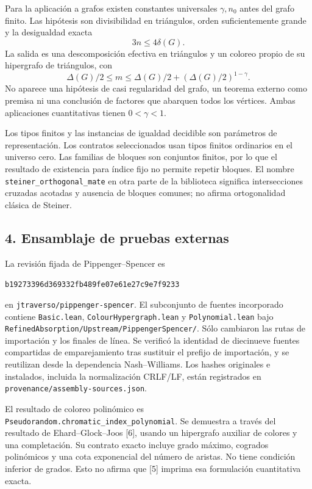 \documentclass[spanish,11pt,a4paper]{article}
\begin{document}
Para la aplicación a grafos existen constantes universales \(\gamma,n_0\) antes del grafo finito. Las hipótesis son divisibilidad en triángulos, orden suficientemente grande y la desigualdad exacta \[3n\le4\delta(G).\] La salida es una descomposición efectiva en triángulos y un coloreo propio de su hipergrafo de triángulos, con \[\Delta(G)/2\le m
\le\Delta(G)/2+(\Delta(G)/2)^{1-\gamma}.\] No aparece una hipótesis de casi regularidad del grafo, un teorema externo como premisa ni una conclusión de factores que abarquen todos los vértices. Ambas aplicaciones cuantitativas tienen \(0<\gamma<1\).

Los tipos finitos y las instancias de igualdad decidible son parámetros de representación. Los contratos seleccionados usan tipos finitos ordinarios en el universo cero. Las familias de bloques son conjuntos finitos, por lo que el resultado de existencia para índice fijo no permite repetir bloques. El nombre \texttt{steiner\_\allowbreak{}orthogonal\_\allowbreak{}mate} en otra parte de la biblioteca significa intersecciones cruzadas acotadas y ausencia de bloques comunes; no afirma ortogonalidad clásica de Steiner.

\subsection{4. Ensamblaje de pruebas externas}\label{ensamblaje-de-pruebas-externas}

La revisión fijada de Pippenger--Spencer es

\texttt{b1927339\allowbreak{}6d369332\allowbreak{}fb489fe0\allowbreak{}7e61e27c\allowbreak{}9e7f9233}

en \texttt{jtraverso/\allowbreak{}pippenger-spencer}. El subconjunto de fuentes incorporado contiene \texttt{Basic.\allowbreak{}lean}, \texttt{Colour\allowbreak{}Hypergraph.\allowbreak{}lean} y \texttt{Polynomial.\allowbreak{}lean} bajo \texttt{Refined\allowbreak{}Absorption/\allowbreak{}Upstream/\allowbreak{}Pippenger\allowbreak{}Spencer/\allowbreak{}}. Sólo cambiaron las rutas de importación y los finales de línea. Se verificó la identidad de diecinueve fuentes compartidas de emparejamiento tras sustituir el prefijo de importación, y se reutilizan desde la dependencia Nash--Williams. Los hashes originales e instalados, incluida la normalización CRLF/LF, están registrados en \texttt{provenance/\allowbreak{}assembly-sources.\allowbreak{}json}.

El resultado de coloreo polinómico es \texttt{Pseudorandom.\allowbreak{}chromatic\_\allowbreak{}index\_\allowbreak{}polynomial}. Se demuestra a través del resultado de Ehard--Glock--Joos {[}6{]}, usando un hipergrafo auxiliar de colores y una completación. Su contrato exacto incluye grado máximo, cogrados polinómicos y una cota exponencial del número de aristas. No tiene condición inferior de grados. Esto no afirma que {[}5{]} imprima esa formulación cuantitativa exacta.
\end{document}
